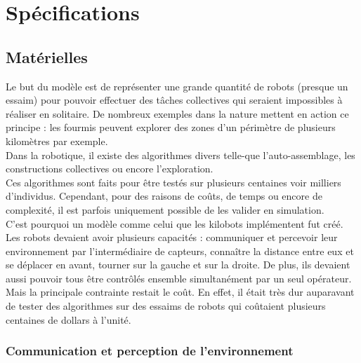 \documentclass[a4paper,8pt]{report}
\begin{document}
\chapter{Sp\'ecifications}

\section*{Mat\'erielles}\label{sec:name}

Le but du mod\`ele est de repr\'esenter une grande quantit\'e de robots (presque un essaim) pour pouvoir effectuer des t\^aches collectives qui seraient impossibles \`a r\'ealiser en solitaire. De nombreux exemples dans la nature mettent en action ce principe : les fourmis peuvent explorer des zones d'un p\'erim\`etre de plusieurs kilom\`etres par exemple. \\
Dans la robotique, il existe des algorithmes divers telle-que l'auto-assemblage, les constructions collectives ou encore l'exploration.\\ 
Ces algorithmes sont faits pour \^etre test\'es sur plusieurs centaines voir milliers d'individus. Cependant, pour des raisons de co\^uts, de temps ou encore de complexit\'e, il est parfois uniquement possible de les valider en simulation. \\
C'est pourquoi un mod\`ele comme celui que les kilobots impl\'ementent fut cr\'e\'e. Les robots devaient avoir plusieurs capacit\'es : communiquer et percevoir leur environnement par l'interm\'ediaire de capteurs, conna\^itre la distance entre eux et se d\'eplacer en avant, tourner sur la gauche et sur la droite. De plus, ils devaient aussi pouvoir tous \^etre contr\^ol\'es ensemble simultan\'ement par un seul op\'erateur. Mais la principale contrainte restait le co\^ut. En effet, il \'etait tr\`es dur auparavant de tester des algorithmes sur des essaims de robots qui co\^utaient plusieurs centaines de dollars \`a l'unit\'e.\\

\subsection*{Communication et perception de l'environnement}\label{subsec:name}
\end{document}
